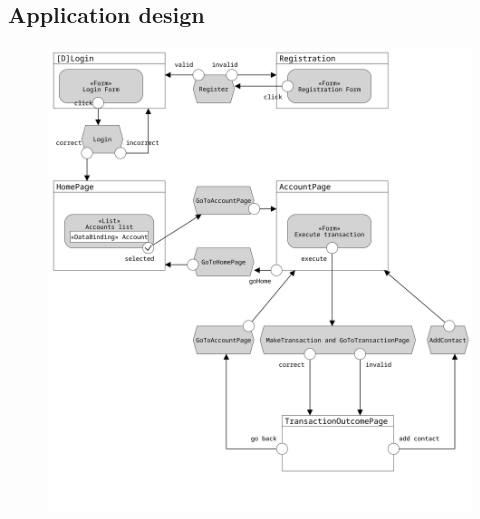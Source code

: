 \documentclass{article}
\begin{document}
\subsection{Application design}
\begin{figure}[H]
	\centering
	\includegraphics[width=1\textwidth]{assets/ifml_pure.png}
\end{figure}
\pagebreak
\end{document}
